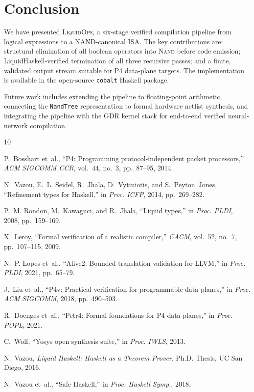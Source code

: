 \documentclass[sigconf,natbib=false]{acmart}
\begin{document}

\section{Conclusion}

We have presented \textsc{LiquidOps}, a six-stage verified compilation pipeline
from logical expressions to a NAND-canonical ISA. The key contributions are:
structural elimination of all boolean operators into \textsc{Nand} before code
emission; LiquidHaskell-verified termination of all three recursive passes; and
a finite, validated output stream suitable for P4 data-plane targets. The
implementation is available in the open-source \texttt{cobalt} Haskell package.

Future work includes extending the pipeline to floating-point arithmetic,
connecting the \texttt{NandTree} representation to formal hardware netlist
synthesis, and integrating the pipeline with the GDR kernel stack for
end-to-end verified neural-network compilation.



\begin{thebibliography}{10}

P.~Bosshart et~al., ``P4: Programming protocol-independent packet processors,''
\emph{ACM SIGCOMM CCR}, vol.~44, no.~3, pp.~87--95, 2014.

N.~Vazou, E.~L. Seidel, R.~Jhala, D.~Vytiniotis, and S.~Peyton~Jones,
``Refinement types for Haskell,'' in \emph{Proc. ICFP}, 2014, pp.~269--282.

P.~M. Rondon, M.~Kawaguci, and R.~Jhala, ``Liquid types,'' in
\emph{Proc. PLDI}, 2008, pp.~159--169.

X.~Leroy, ``Formal verification of a realistic compiler,'' \emph{CACM},
vol.~52, no.~7, pp.~107--115, 2009.

N.~P. Lopes et~al., ``Alive2: Bounded translation validation for LLVM,''
in \emph{Proc. PLDI}, 2021, pp.~65--79.

J.~Liu et~al., ``P4v: Practical verification for programmable data planes,''
in \emph{Proc. ACM SIGCOMM}, 2018, pp.~490--503.

R.~Doenges et~al., ``Petr4: Formal foundations for P4 data planes,''
in \emph{Proc. POPL}, 2021.

C.~Wolf, ``Yosys open synthesis suite,'' in \emph{Proc. IWLS}, 2013.

N.~Vazou, \emph{Liquid Haskell: Haskell as a Theorem Prover}.
Ph.D. Thesis, UC San Diego, 2016.

N.~Vazou et~al., ``Safe Haskell,'' in \emph{Proc. Haskell Symp.}, 2018.

\end{thebibliography}
\end{document}

